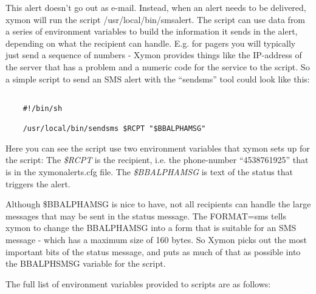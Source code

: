  This alert doesn't go out as e-mail. Instead, when an alert needs to be delivered, xymon will run the script /usr/local/bin/smsalert. The script can use data from a series of environment variables to build the information it sends in the alert, depending on what the recipient can handle. E.g. for pagers you will typically just send a sequence of numbers - Xymon provides things like the IP-address of the server that has a problem and a numeric code for the service to the script. So a simple script to send an SMS alert with the ``sendsms'' tool could look like this:
\begin{verbatim}

	#!/bin/sh

	/usr/local/bin/sendsms $RCPT "$BBALPHAMSG"

\end{verbatim}


 Here you can see the script use two environment variables that xymon sets up for the script: The \emph{\$RCPT}
 is the recipient, i.e. the phone-number ``4538761925'' that is in the xymonalerts.cfg file. The \emph{\$BBALPHAMSG}
 is text of the status that triggers the alert.


 Although \$BBALPHAMSG is nice to have, not all recipients can handle the large messages that may be sent in the status message. The FORMAT=sms tells xymon to change the BBALPHAMSG into a form that is suitable for an SMS message - which has a maximum size of 160 bytes. So Xymon picks out the most important bits of the status message, and puts as much of that as possible into the BBALPHSMSG variable for the script.


 The full list of environment variables provided to scripts are as follows:


%



